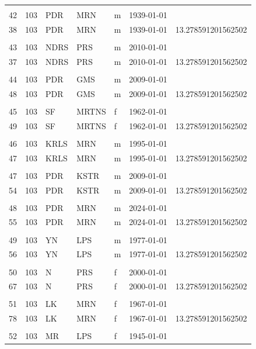 \documentclass[
  12pt,
]{book}
\begin{document}
\begin{table}[t]
\begin{tabular*}{1\linewidth}{@{\extracolsep{\fill}}rrlllrr}
 &  &  &  &  &  &  \\ 
42 & 103 & PDR & MRN & m & 1939-01-01 &  \\ 
38 & 103 & PDR & MRN & m & 1939-01-01 & 13.278591201562502 \\ 
 &  &  &  &  &  &  \\ 
43 & 103 & NDRS & PRS & m & 2010-01-01 &  \\ 
37 & 103 & NDRS & PRS & m & 2010-01-01 & 13.278591201562502 \\ 
 &  &  &  &  &  &  \\ 
44 & 103 & PDR & GMS & m & 2009-01-01 &  \\ 
48 & 103 & PDR & GMS & m & 2009-01-01 & 13.278591201562502 \\ 
 &  &  &  &  &  &  \\ 
45 & 103 & SF & MRTNS & f & 1962-01-01 &  \\ 
49 & 103 & SF & MRTNS & f & 1962-01-01 & 13.278591201562502 \\ 
 &  &  &  &  &  &  \\ 
46 & 103 & KRLS & MRN & m & 1995-01-01 &  \\ 
47 & 103 & KRLS & MRN & m & 1995-01-01 & 13.278591201562502 \\ 
 &  &  &  &  &  &  \\ 
47 & 103 & PDR & KSTR & m & 2009-01-01 &  \\ 
54 & 103 & PDR & KSTR & m & 2009-01-01 & 13.278591201562502 \\ 
 &  &  &  &  &  &  \\ 
48 & 103 & PDR & MRN & m & 2024-01-01 &  \\ 
55 & 103 & PDR & MRN & m & 2024-01-01 & 13.278591201562502 \\ 
 &  &  &  &  &  &  \\ 
49 & 103 & YN & LPS & m & 1977-01-01 &  \\ 
56 & 103 & YN & LPS & m & 1977-01-01 & 13.278591201562502 \\ 
 &  &  &  &  &  &  \\ 
50 & 103 & N & PRS & f & 2000-01-01 &  \\ 
67 & 103 & N & PRS & f & 2000-01-01 & 13.278591201562502 \\ 
 &  &  &  &  &  &  \\ 
51 & 103 & LK & MRN & f & 1967-01-01 &  \\ 
78 & 103 & LK & MRN & f & 1967-01-01 & 13.278591201562502 \\ 
 &  &  &  &  &  &  \\ 
52 & 103 & MR & LPS & f & 1945-01-01 &  \\ 

\end{tabular*}
\end{table}
\end{document}
